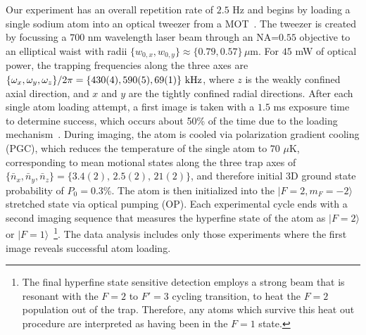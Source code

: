 \documentclass[aps,prl,twocolumn,groupedaddress]{revtex4-1}
\begin{document}
Our experiment has an overall repetition rate of $2.5$ Hz and
begins by loading a single sodium atom into an optical tweezer from a MOT~\cite{Hutzler2017-LightShifts}.
The tweezer is created by focussing a $700$ nm wavelength laser beam through an NA=$0.55$ objective to an elliptical waist with radii $\{w_{0,x},w_{0,y}\}\approx \{0.79,0.57\}\,\mu$m.
For $45$ mW of optical power, the trapping frequencies along the three axes are
$\{\omega_x,\omega_y,\omega_z\}/2\pi = \{430(4), 590(5), 69(1)\}\ \text{\text{kHz}}$,
where  $z$ is the weakly confined axial direction,
and  $x$ and $y$ are the tightly confined radial directions.
After each single atom loading attempt, a first image is taken with a $1.5$ ms exposure time
to determine success, which occurs about 50\% of the time due to the loading mechanism~\cite{Schlosser2001}.
During  imaging, the atom is cooled via polarization gradient cooling (PGC),
which reduces the temperature of the single atom to $70$ $\mu$K,
corresponding to mean motional states along the three trap axes of
$\{\bar n_x, \bar n_y, \bar n_z\}=\{3.4(2),\, 2.5(2),\, 21(2)\}$, and therefore initial 3D ground state probability of $P_0=0.3$\%.
The atom is then initialized  into
the $|F=2, m_F=-2\rangle$ stretched state via optical pumping (OP).
Each experimental cycle ends with a second imaging sequence that measures the hyperfine state of the atom as $|F=2\rangle$ or $|F=1\rangle$~\footnote{The final hyperfine state sensitive detection employs a strong beam that is resonant with the $F=2$ to $F'=3$ cycling transition, to heat the $F=2$ population out of the trap.  Therefore, any atoms which survive this heat out procedure are interpreted as having been in the $F=1$ state.}. The data analysis includes only those experiments where the first image  reveals successful atom loading.

\end{document}
